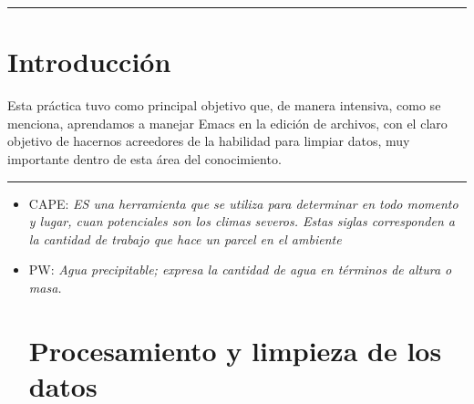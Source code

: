 \documentclass{article}
\begin{document}
\pagebreak
\begin{doublespace}


\hrule
\section{Introducción}
Esta práctica tuvo como principal objetivo que, de manera intensiva, como se menciona, aprendamos a manejar Emacs en la edición de archivos, con el claro objetivo de hacernos acreedores de la habilidad para limpiar datos, muy importante dentro de esta área del conocimiento.

\hrule

\begin{itemize}

\section{Conceptos}

\item CAPE: \textit{ES una herramienta que se utiliza para determinar en todo momento y lugar, cuan potenciales son los climas severos. Estas siglas corresponden a la cantidad de trabajo que hace un parcel en el ambiente} 
\item PW: \textit{Agua precipitable; expresa la cantidad de agua en términos de altura o masa.}

\section{Procesamiento y limpieza de los datos}


\end{itemize}
\end{doublespace}
\end{document}
